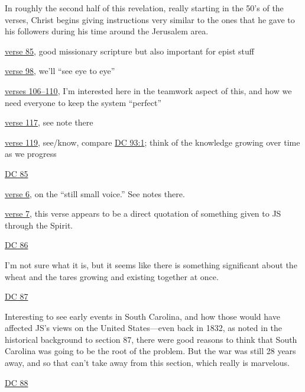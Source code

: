 \begin{compactdesc}
\begin{compactitem}
					\item In roughly the second half of this revelation, really starting in the 50's of the verses, Christ begins giving instructions very similar to the ones that he gave to his followers during his time around the Jerusalem area.
					\item \hyperref[DC84-85]{verse 85}, good missionary scripture but also important for epist stuff
					\item \hyperref[DC84-98]{verse 98}, we'll ``see eye to eye''
					\item \hyperref[DC84-106]{verses 106--110}, I'm interested here in the teamwork aspect of this, and how we need everyone to keep the system ``perfect''
					\item \hyperref[DC84-117]{verse 117}, see note there
					\item \hyperref[DC84-119]{verse 119}, see/know, compare \hyperref[DC93-1]{DC 93:1}; think of the knowledge growing over time as we progress
				\end{compactitem}
			\item \hyperref[DC85]{DC 85}
				\begin{compactitem}
					\item \hyperref[DC85-6]{verse 6}, on the ``still small voice.'' See notes there.
					\item \hyperref[DC85-7]{verse 7}, this verse appears to be a direct quotation of something given to JS through the Spirit.
				\end{compactitem}
			\item \hyperref[DC86]{DC 86}
				\begin{compactitem}
					\item I'm not sure what it is, but it seems like there is something significant about the wheat and the tares growing and existing together at once. 
				\end{compactitem} 
			\item \hyperref[DC87]{DC 87}
				\begin{compactitem}
					\item Interesting to see early events in South Carolina, and how those would have affected JS's views on the United States---even back in 1832, as noted in the historical background to section 87, there were good reasons to think that South Carolina was going to be the root of the problem. But the war was still 28 years away, and so that can't take away from this section, which really is marvelous. 
				\end{compactitem}
			\item \hyperref[DC88]{DC 88}

\end{compactdesc}
